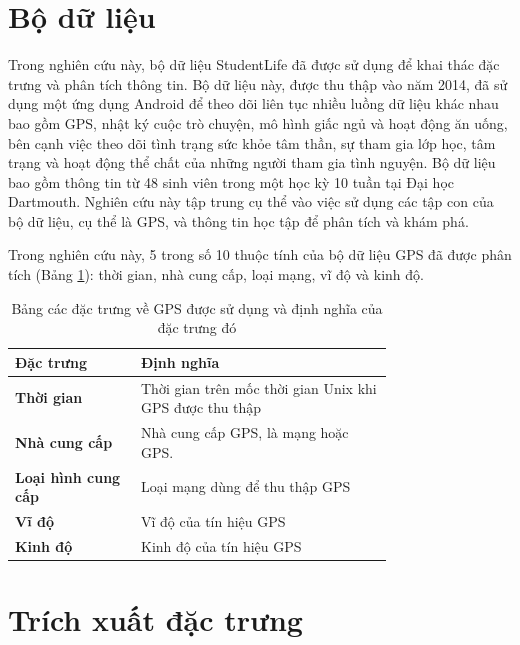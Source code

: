 \section{Bộ dữ liệu}
Trong nghiên cứu này, bộ dữ liệu StudentLife \cite{student_life} đã được sử dụng để khai thác đặc trưng và phân tích thông tin. Bộ dữ liệu này, được thu thập vào năm 2014, đã sử dụng một ứng dụng Android để theo dõi liên tục nhiều luồng dữ liệu khác nhau bao gồm GPS, nhật ký cuộc trò chuyện, mô hình giấc ngủ và hoạt động ăn uống, bên cạnh việc theo dõi tình trạng sức khỏe tâm thần, sự tham gia lớp học, tâm trạng và hoạt động thể chất của những người tham gia tình nguyện. Bộ dữ liệu bao gồm thông tin từ 48 sinh viên trong một học kỳ 10 tuần tại Đại học Dartmouth. Nghiên cứu này tập trung cụ thể vào việc sử dụng các tập con của bộ dữ liệu, cụ thể là GPS, và thông tin học tập để phân tích và khám phá.

Trong nghiên cứu này, 5 trong số 10 thuộc tính của bộ dữ liệu GPS đã được phân tích (Bảng \ref{dataset}): thời gian, nhà cung cấp, loại mạng, vĩ độ và kinh độ.
\begin{table}[ht]
\caption{Bảng các đặc trưng về GPS được sử dụng và định nghĩa của đặc trưng đó}
\fontsize{13}{16}
\selectfont
\begin{center}
\begin{tabular}{p{0.25\linewidth}  p{0.5\linewidth}}
\hline
\textbf{Đặc trưng}&\textbf{Định nghĩa}\\
\hline
\textbf{Thời gian} & Thời gian trên mốc thời gian Unix khi GPS được thu thập \\

\textbf{Nhà cung cấp} & Nhà cung cấp GPS, là mạng hoặc GPS.\\

\textbf{Loại hình cung cấp} &Loại mạng dùng để thu thập GPS \\

\textbf{Vĩ độ} &Vĩ độ của tín hiệu GPS\\

\textbf{Kinh độ} & Kinh độ của tín hiệu GPS \\
\hline
\end{tabular}
\label{dataset}
\end{center}
\end{table}



\section{Trích xuất đặc trưng}\label{feat_ext}

